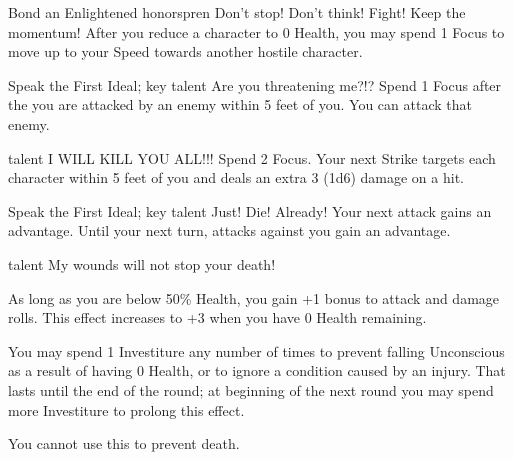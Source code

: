 		{Bond an Enlightened honorspren}
		{\iconReaction}
		{Don't stop! Don't think! Fight! Keep the momentum!}
		{After you reduce a character to 0 Health, you may spend 1 Focus to move up to your Speed towards another hostile character.}
		
\talent{\talentWindrunnerLashOutName}
		{Speak the First Ideal; \talentWindrunnerKeyName{} key talent}
		{\iconReaction}
		{Are you threatening me?!?}
		{Spend 1 Focus after the you are attacked by an enemy within 5 feet of you. You can attack that enemy.}
		
\talent{\talentWindrunnerBerserkName}
		{\talentWindrunnerLashOutName{} talent}
		{\iconFreeAction}
		{I WILL KILL YOU ALL!!!}
		{Spend 2 Focus. Your next Strike targets each character within 5 feet of you and deals an extra 3 (1d6) damage on a hit.}
		
\talent{\talentWindrunnerRecklessName}
		{Speak the First Ideal; \talentWindrunnerKeyName{} key talent}
		{\iconFreeAction}
		{Just! Die! Already!}
		{Your next attack gains an advantage. Until your next turn, attacks against you gain an advantage.}
		
\talent{\talentWindrunnerSeeRedName}
		{\talentWindrunnerRecklessName{} talent}
		{\iconSpecial}
		{My wounds will not stop your death!}
		{As long as you are below 50\% Health, you gain +1 bonus to attack and damage rolls. This effect increases to +3 when you have 0 Health remaining.
		
		You may spend 1 Investiture any number of times to prevent falling Unconscious as a result of having 0 Health, or to ignore a condition caused by an injury. That lasts until the end of the round; at beginning of the next round you may spend more Investiture to prolong this effect. 
		
		You cannot use this to prevent death.}		


